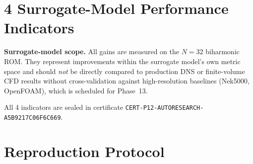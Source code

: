 \documentclass[10pt,twocolumn]{article}
\begin{document}
\section{4 Surrogate-Model Performance Indicators}
\label{sec:gains}

\begin{table}[h]
\centering
\small
\caption{4 Surrogate-Model Performance Indicators ($N{=}32$ ROM)}
\label{tab:gains}
\end{table}

\noindent\textbf{Surrogate-model scope.} All gains are measured on the $N{=}32$
biharmonic ROM. They represent improvements within the surrogate model's
own metric space and should \emph{not} be directly compared to production
DNS or finite-volume CFD results without cross-validation against
high-resolution baselines (Nek5000, OpenFOAM), which is scheduled for Phase~13.

All 4 indicators are sealed in certificate \texttt{CERT-P12-AUTORESEARCH-A5B9217C06F6C669}.

\section{Reproduction Protocol}
\label{sec:repro}
\end{document}
